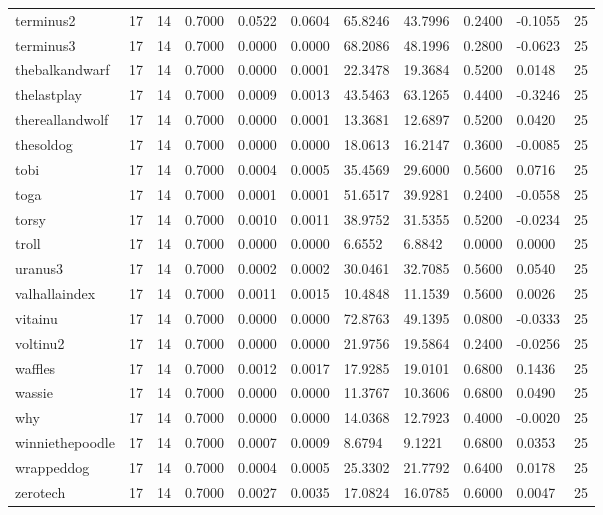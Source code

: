 \begin{table}[htbp]
\begin{tabular}{lllllllllll}
terminus2 & 17 & 14 & 0.7000 & 0.0522 & 0.0604 & 65.8246 & 43.7996 & 0.2400 & -0.1055 & 25 \\
terminus3 & 17 & 14 & 0.7000 & 0.0000 & 0.0000 & 68.2086 & 48.1996 & 0.2800 & -0.0623 & 25 \\
thebalkandwarf & 17 & 14 & 0.7000 & 0.0000 & 0.0001 & 22.3478 & 19.3684 & 0.5200 & 0.0148 & 25 \\
thelastplay & 17 & 14 & 0.7000 & 0.0009 & 0.0013 & 43.5463 & 63.1265 & 0.4400 & -0.3246 & 25 \\
thereallandwolf & 17 & 14 & 0.7000 & 0.0000 & 0.0001 & 13.3681 & 12.6897 & 0.5200 & 0.0420 & 25 \\
thesoldog & 17 & 14 & 0.7000 & 0.0000 & 0.0000 & 18.0613 & 16.2147 & 0.3600 & -0.0085 & 25 \\
tobi & 17 & 14 & 0.7000 & 0.0004 & 0.0005 & 35.4569 & 29.6000 & 0.5600 & 0.0716 & 25 \\
toga & 17 & 14 & 0.7000 & 0.0001 & 0.0001 & 51.6517 & 39.9281 & 0.2400 & -0.0558 & 25 \\
torsy & 17 & 14 & 0.7000 & 0.0010 & 0.0011 & 38.9752 & 31.5355 & 0.5200 & -0.0234 & 25 \\
troll & 17 & 14 & 0.7000 & 0.0000 & 0.0000 & 6.6552 & 6.8842 & 0.0000 & 0.0000 & 25 \\
uranus3 & 17 & 14 & 0.7000 & 0.0002 & 0.0002 & 30.0461 & 32.7085 & 0.5600 & 0.0540 & 25 \\
valhallaindex & 17 & 14 & 0.7000 & 0.0011 & 0.0015 & 10.4848 & 11.1539 & 0.5600 & 0.0026 & 25 \\
vitainu & 17 & 14 & 0.7000 & 0.0000 & 0.0000 & 72.8763 & 49.1395 & 0.0800 & -0.0333 & 25 \\
voltinu2 & 17 & 14 & 0.7000 & 0.0000 & 0.0000 & 21.9756 & 19.5864 & 0.2400 & -0.0256 & 25 \\
waffles & 17 & 14 & 0.7000 & 0.0012 & 0.0017 & 17.9285 & 19.0101 & 0.6800 & 0.1436 & 25 \\
wassie & 17 & 14 & 0.7000 & 0.0000 & 0.0000 & 11.3767 & 10.3606 & 0.6800 & 0.0490 & 25 \\
why & 17 & 14 & 0.7000 & 0.0000 & 0.0000 & 14.0368 & 12.7923 & 0.4000 & -0.0020 & 25 \\
winniethepoodle & 17 & 14 & 0.7000 & 0.0007 & 0.0009 & 8.6794 & 9.1221 & 0.6800 & 0.0353 & 25 \\
wrappeddog & 17 & 14 & 0.7000 & 0.0004 & 0.0005 & 25.3302 & 21.7792 & 0.6400 & 0.0178 & 25 \\
zerotech & 17 & 14 & 0.7000 & 0.0027 & 0.0035 & 17.0824 & 16.0785 & 0.6000 & 0.0047 & 25 \\

\end{tabular}
\end{table}
